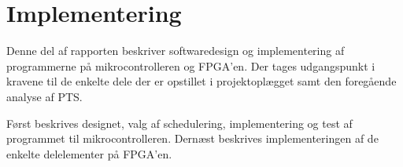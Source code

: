 \part{Implementering}
Denne del af rapporten beskriver softwaredesign og implementering af programmerne
på mikrocontrolleren og FPGA'en.
Der tages udgangspunkt i kravene til de enkelte dele der er opstillet i projektoplægget samt den foregående analyse af PTS.

Først beskrives designet, valg af schedulering,
implementering og test af programmet til mikrocontrolleren.
Dernæst beskrives implementeringen af de enkelte delelementer på FPGA'en.


%
